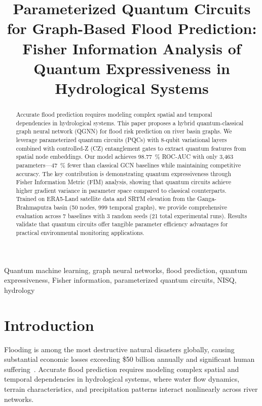 \documentclass[conference]{IEEEtran}
\begin{document}
\title{Parameterized Quantum Circuits for Graph-Based Flood Prediction: Fisher Information Analysis of Quantum Expressiveness in Hydrological Systems}

\author{
}

\maketitle

\begin{abstract}
Accurate flood prediction requires modeling complex spatial and temporal dependencies in hydrological systems. This paper proposes a hybrid quantum-classical graph neural network (QGNN) for flood risk prediction on river basin graphs. We leverage parameterized quantum circuits (PQCs) with 8-qubit variational layers combined with controlled-Z (CZ) entanglement gates to extract quantum features from spatial node embeddings. Our model achieves \SI{98.77}{\percent} ROC-AUC with only 3,463 parameters---\SI{47}{\percent} fewer than classical GCN baselines while maintaining competitive accuracy. The key contribution is demonstrating quantum expressiveness through Fisher Information Metric (FIM) analysis, showing that quantum circuits achieve higher gradient variance in parameter space compared to classical counterparts. Trained on ERA5-Land satellite data and SRTM elevation from the Ganga-Brahmaputra basin (50 nodes, 999 temporal graphs), we provide comprehensive evaluation across 7 baselines with 3 random seeds (21 total experimental runs). Results validate that quantum circuits offer tangible parameter efficiency advantages for practical environmental monitoring applications.
\end{abstract}

\begin{IEEEkeywords}
Quantum machine learning, graph neural networks, flood prediction, quantum expressiveness, Fisher information, parameterized quantum circuits, NISQ, hydrology
\end{IEEEkeywords}

\section{Introduction}

Flooding is among the most destructive natural disasters globally, causing substantial economic losses exceeding \$50 billion annually and significant human suffering~\cite{b6}. Accurate flood prediction requires modeling complex spatial and temporal dependencies in hydrological systems, where water flow dynamics, terrain characteristics, and precipitation patterns interact nonlinearly across river networks.
\end{document}
